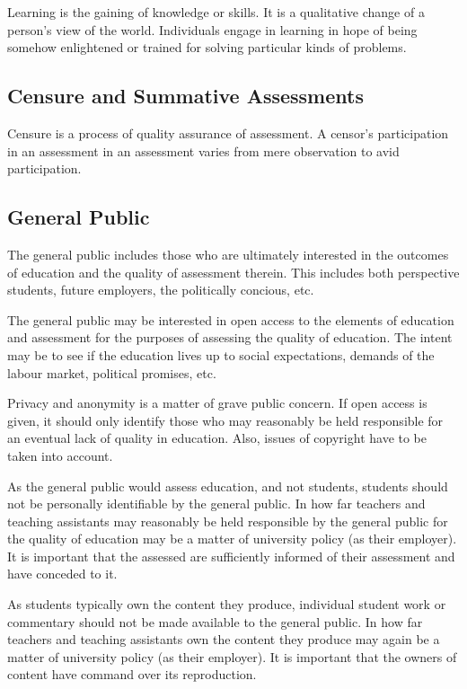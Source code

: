 Learning is the gaining of knowledge or skills. It is a qualitative change of a
person's view of the world. Individuals engage in learning in hope of being
somehow enlightened or trained for solving particular kinds of problems.

\subsection{Censure and Summative Assessments}

Censure is a process of quality assurance of assessment. A censor's
participation in an assessment in an assessment varies from mere observation to
avid participation.

\subsection{General Public}

The general public includes those who are ultimately interested in the outcomes
of education and the quality of assessment therein. This includes both
perspective students, future employers, the politically concious, etc.

The general public may be interested in open access to the elements of
education and assessment for the purposes of assessing the quality of
education. The intent may be to see if the education lives up to social
expectations, demands of the labour market, political promises, etc.

Privacy and anonymity is a matter of grave public concern. If open access is
given, it should only identify those who may reasonably be held responsible for
an eventual lack of quality in education. Also, issues of copyright have to be
taken into account.

As the general public would assess education, and not students, students should
not be personally identifiable by the general public. In how far teachers and
teaching assistants may reasonably be held responsible by the general public
for the quality of education may be a matter of university policy (as their
employer). It is important that the assessed are sufficiently informed of their
assessment and have conceded to it.

As students typically own the content they produce, individual student work or
commentary should not be made available to the general public. In how far
teachers and teaching assistants own the content they produce may again be a
matter of university policy (as their employer). It is important that the
owners of content have command over its reproduction.
